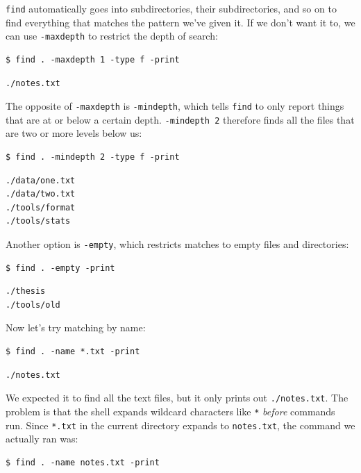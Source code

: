\documentclass{book}
\begin{document}
\texttt{find} automatically goes into subdirectories, their
subdirectories, and so on to find everything that matches the pattern
we've given it. If we don't want it to, we can use \texttt{-maxdepth} to
restrict the depth of search:

\begin{verbatim}
$ find . -maxdepth 1 -type f -print
\end{verbatim}

\begin{verbatim}
./notes.txt
\end{verbatim}

The opposite of \texttt{-maxdepth} is \texttt{-mindepth}, which tells
\texttt{find} to only report things that are at or below a certain
depth. \texttt{-mindepth 2} therefore finds all the files that are two
or more levels below us:

\begin{verbatim}
$ find . -mindepth 2 -type f -print
\end{verbatim}

\begin{verbatim}
./data/one.txt
./data/two.txt
./tools/format
./tools/stats
\end{verbatim}

Another option is \texttt{-empty}, which restricts matches to empty
files and directories:

\begin{verbatim}
$ find . -empty -print
\end{verbatim}

\begin{verbatim}
./thesis
./tools/old
\end{verbatim}

Now let's try matching by name:

\begin{verbatim}
$ find . -name *.txt -print
\end{verbatim}

\begin{verbatim}
./notes.txt
\end{verbatim}

We expected it to find all the text files, but it only prints out
\texttt{./notes.txt}. The problem is that the shell expands wildcard
characters like \texttt{*} \emph{before} commands run. Since
\texttt{*.txt} in the current directory expands to \texttt{notes.txt},
the command we actually ran was:

\begin{verbatim}
$ find . -name notes.txt -print
\end{verbatim}
\end{document}
